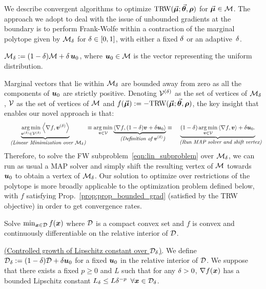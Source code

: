 We describe convergent algorithms to optimize $\text{TRW}(\vec{\bm{\mu}};\vec{\bm{\theta}},\bm{\rho})$ for $\vec{\bm{\mu}} \in \mathcal{M}$. 
%
The approach we adopt to deal with the issue of unbounded gradients at the boundary
is to perform Frank-Wolfe within a contraction of the marginal polytope
given by $\mathcal{M}_{\delta}$ for $\delta \in [0,1]$, with either a fixed $\delta$ or an adaptive~$\delta$.
\begin{definition}
	$\mathcal{M}_{\delta} := (1-\delta) \mathcal{M} + \delta\, \bm{u}_0$,
        where $\bm{u}_0\in \mathcal{M}$ is the vector representing the uniform
        distribution.
\end{definition}
\vspace{-1mm}
%
Marginal vectors that lie within $\mathcal{M}_{\delta}$ are bounded away from zero as all the components of $\bm{u}_0$
are strictly positive. 
%
%
%
Denoting $\mathcal{V}^{(\delta)}$ as the
set of vertices of $\mathcal{M}_{\delta}$, $\mathcal{V}$ as the set of vertices of $\mathcal{M}$ and $f(\vec{\bm{\mu}}) := -\text{TRW}(\vec{\bm{\mu}};\vec{\bm{\theta}},\bm{\rho})$, the key insight
that enables our novel approach is that:
%
%
%
%
%
%
%
\small
\begin{equation*}
	\underbrace{\operatorname*{\arg\min}_{\bm{v}^{(\delta)}\in \mathcal{V}^{(\delta)}}\left\langle \nabla f , \bm{v}^{(\delta)} \right\rangle}_{\quad\emph{\small{(Linear Minimization over $\mathcal{M}_{\delta}$)}}} \equiv\operatorname*{\arg\min}_{\bm{v} \in \mathcal{V}} \underbrace{\left\langle \nabla f , (1-\delta)\bm{v} + \delta\bm{u}_0 \right\rangle}_{\quad\emph{\small{(Definition of $\bm{v}^{(\delta)}$)}}} 
\equiv\underbrace{(1-\delta) \operatorname*{\arg\min}_{\bm{v} \in \mathcal{V}}\left\langle \nabla f , \bm{v} \right\rangle + \delta\bm{u}_0.}_{\quad\emph{\small{(Run MAP solver and shift vertex)}}} 
\end{equation*}
\normalsize
Therefore, to solve the FW subproblem~\eqref{eqn:lin_subproblem} over $\mathcal{M}_{\delta}$, we can run as usual a MAP solver  and simply shift the resulting vertex of $\mathcal{M}$ towards $\bm{u}_0$ to obtain a vertex of $\mathcal{M}_{\delta}$. 
Our solution to optimize over restrictions of the polytope is more broadly applicable to the optimization problem defined below, with $f$ satisfying Prop.~\ref{prop:prop_bounded_grad} (satisfied by the TRW objective) in order to get convergence rates.
\begin{problem} 	
\label{prop:generic_fxn}
Solve $\min_{\bm{x}\in\mathcal{D}}f(\bm{x})$ where $\mathcal{D}$ is a compact convex set and $f$ is convex and continuously differentiable on the relative interior of $\mathcal{D}$.
\end{problem}
%
%
%
%
%
%
%
%
\begin{properties}
\hyperref[sec:trw_bounded_lip]{(Controlled growth of Lipschitz constant over $\mathcal{D}_{\delta}$)}.
\label{prop:prop_bounded_grad}
We define $\mathcal{D}_{\delta}:= (1-\delta)\mathcal{D} + \delta\bm{u}_0$ for a fixed $\bm{u}_0$ in the relative interior of $\mathcal{D}$. We suppose that there exists a fixed $p \geq 0$ and $L$ such that for any $\delta > 0$, $\nabla f(\bm{x})$ has a bounded Lipschitz constant $L_{\delta} \leq L\delta^{-p}\,\,\,\forall \bm{x}\in\mathcal{D}_{\delta}$.
\end{properties}
%
%
%
%
%
%

